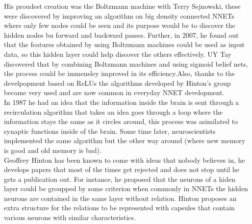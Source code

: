 \documentclass[11pt]{report}
\begin{document}
His proudest creation was the Boltzmann machine with Terry Sejnowski, these were discovered by improving an algorithm on big density connected NNETs where only few nodes could be seen and its purpose would be to discover the hidden nodes bu forward and backward passes. Further, in 2007, he found out that the features obtained by using Boltzmann machines could be used as input data, so this hidden layer could help discover the others effectively. UY Tay discovered that by combining Boltzmann machines and using sigmoid belief nets, the process could be immensley improved in its efficiency.Also, thanks to the develpopment based on ReLUs the algorithms developed by Hinton's group became very used and are now common in everyday NNET development.\\
\textit{} In 1987 he had an idea that the information inside the brain is sent through a recirculation algorithm that takes an idea goes through a loop where the information stays the same as it circles around, this process was asimilated to synaptic functions inside of the brain. Some time later, neuroscientists implemented the same algorithm but the other way around (where new memory is good and old memory is bad).\\
Geoffrey Hinton has been known to come with ideas that nobody believes in, he develops papers that most of the times get rejected and does not stop until he gets a publication out. For instance, he proposed that the neurons of a hiden layer could be groupped by some criterion when commonly in NNETs the hidden neurons are contained in the same layer without relation. Hinton proposes an extra structure for the relations to be represented with capsules that contain various neurons with similar characteristics.\textit{}\\
\end{document}
